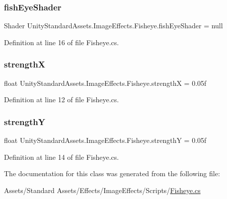 \subsubsection{\texorpdfstring{fish\+Eye\+Shader}{fishEyeShader}}
{\footnotesize\ttfamily Shader Unity\+Standard\+Assets.\+Image\+Effects.\+Fisheye.\+fish\+Eye\+Shader = null}



Definition at line 16 of file Fisheye.\+cs.

\mbox{\label{class_unity_standard_assets_1_1_image_effects_1_1_fisheye_ac744dacc09e3b47d06a5022671ec92cd}} 
\subsubsection{\texorpdfstring{strengthX}{strengthX}}
{\footnotesize\ttfamily float Unity\+Standard\+Assets.\+Image\+Effects.\+Fisheye.\+strengthX = 0.\+05f}



Definition at line 12 of file Fisheye.\+cs.

\mbox{\label{class_unity_standard_assets_1_1_image_effects_1_1_fisheye_ac9a0d9f7b2b959fbd2c11ecc7148df46}} 
\subsubsection{\texorpdfstring{strengthY}{strengthY}}
{\footnotesize\ttfamily float Unity\+Standard\+Assets.\+Image\+Effects.\+Fisheye.\+strengthY = 0.\+05f}



Definition at line 14 of file Fisheye.\+cs.



The documentation for this class was generated from the following file\+:\begin{DoxyCompactItemize}
\item 
Assets/\+Standard Assets/\+Effects/\+Image\+Effects/\+Scripts/\mbox{\hyperlink{_fisheye_8cs}{Fisheye.\+cs}}\end{DoxyCompactItemize}
